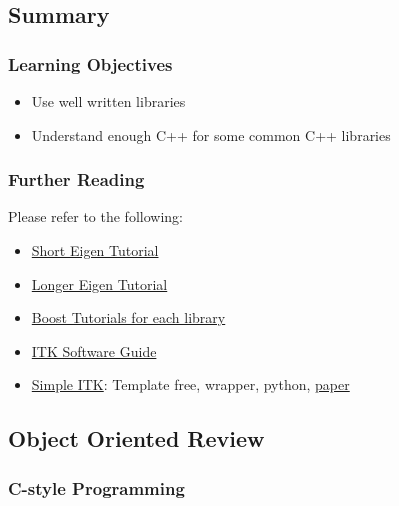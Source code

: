 \subsection{Summary}\label{summary-3}

\subsubsection{Learning Objectives}\label{learning-objectives}

\begin{itemize}
\itemsep1pt\parskip0pt
\item
  Use well written libraries
\item
  Understand enough C++ for some common C++ libraries
\end{itemize}

\subsubsection{Further Reading}\label{further-reading}

Please refer to the following:

\begin{itemize}
\itemsep1pt\parskip0pt
\item
  \href{http://eigen.tuxfamily.org/dox/GettingStarted.html}{Short Eigen
  Tutorial}
\item
  \href{http://eigen.tuxfamily.org/dox/group__TutorialMatrixClass.html}{Longer
  Eigen Tutorial}
\item
  \href{http://www.boost.org}{Boost Tutorials for each library}
\item
  \href{http://www.itk.org/ItkSoftwareGuide.pdf}{ITK Software Guide}
\item
  \href{http://www.simpleitk.org}{Simple ITK}: Template free, wrapper,
  python,
  \href{http://www.ncbi.nlm.nih.gov/pmc/articles/PMC3874546/pdf/fninf-07-00045.pdf}{paper}
\end{itemize}

\subsection{Object Oriented Review}\label{object-oriented-review}

\subsubsection{C-style Programming}\label{c-style-programming}

